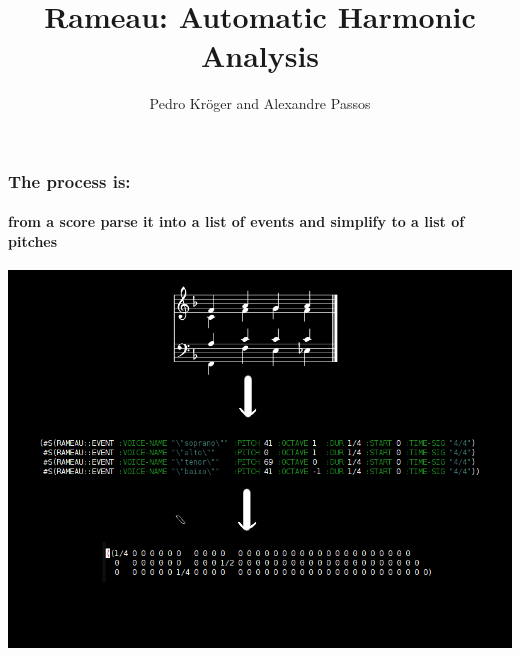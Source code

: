 \documentclass{beamer}
\title{Rameau: Automatic Harmonic Analysis}
\author{Pedro Kröger and Alexandre Passos}
\begin{document}
\maketitle

\begin{frame}
  \frametitle{The process is:}
  \framesubtitle{from a score parse it into a list of events and
    simplify to a list of pitches}
  \addvspace{2.5em}
   \includegraphics[scale=0.45, trim = 5em 0cm 0cm 4em]{figs/process}
\end{frame}
\end{document}
